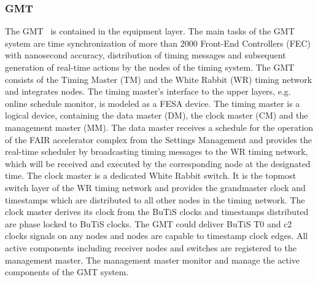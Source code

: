 \subsubsection{GMT}
The GMT~\cite{beck_new_2012} is contained in the equipment layer. The main tasks of the GMT system are time synchronization of more than 2000 Front-End Controllers (\gls{FEC}) with nanosecond accuracy, distribution of timing messages and subsequent generation of real-time actions by the nodes of the timing system. The GMT consists of the Timing Master (\gls{TM}) and the White Rabbit (WR) timing network and integrates nodes. The timing master's interface to the upper layers, e.g. online schedule monitor, is modeled as a FESA device. The timing master is a logical device, containing the data master (\gls{DM}), the clock master (\gls{CM}) and the management master (\gls{MM}). The data master receives a schedule for the operation of the FAIR accelerator complex from the Settings Management and provides the real-time scheduler by broadcasting timing messages to the WR timing network, which will be received and executed by the corresponding node at the designated time. The clock master is a dedicated White Rabbit switch. It is the topmost switch layer of the WR timing network and provides the grandmaster clock and timestamps which are distributed to all other nodes in the timing network. The clock master derives its clock from the BuTiS clocks and timestamps distributed are phase locked to BuTiS clocks. The GMT could deliver BuTiS T0 and c2 clocks signals on any nodes and nodes are capable to timestamp clock edges. All active components including receiver nodes and switches are registered to the management master. The management master monitor and manage the active components of the GMT system.

